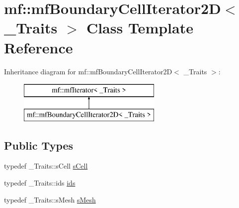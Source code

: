 \hypertarget{classmf_1_1mfBoundaryCellIterator2D}{
\section{mf::mfBoundaryCellIterator2D$<$ \_\-Traits $>$ Class Template Reference}
\label{classmf_1_1mfBoundaryCellIterator2D}
}
Inheritance diagram for mf::mfBoundaryCellIterator2D$<$ \_\-Traits $>$:\begin{figure}[H]
\begin{center}
\leavevmode
\includegraphics[height=2.000000cm]{classmf_1_1mfBoundaryCellIterator2D}
\end{center}
\end{figure}
\subsection*{Public Types}
\begin{DoxyCompactItemize}
\item 
typedef \_\-Traits::sCell \hyperlink{classmf_1_1mfBoundaryCellIterator2D_a3967d94a03a79073ae062491031e5339}{sCell}
\item 
typedef \_\-Traits::ids \hyperlink{classmf_1_1mfBoundaryCellIterator2D_ac315487c67a3604069747dc93ccb2fa0}{ids}
\item 
typedef \_\-Traits::sMesh \hyperlink{classmf_1_1mfBoundaryCellIterator2D_a4a2bc693e6241fee66020dd32ae7115e}{sMesh}
\end{DoxyCompactItemize}
